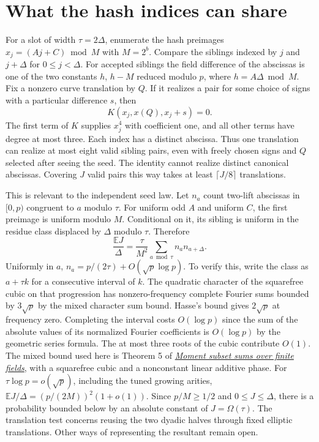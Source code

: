 \documentclass[11pt]{article}
\newcommand{\E}{\mathbb E}
\begin{document}
\section{What the hash indices can share}
For a slot of width $\tau=2\Delta$, enumerate the hash preimages
$x_j=(A j+C)\bmod M$ with $M=2^b$. Compare the siblings indexed
by $j$ and $j+\Delta$ for $0\le j<\Delta$. For accepted siblings
the field difference of the abscissas is one of the two constants
$h$, $h-M$ reduced modulo $p$, where $h=A\Delta\bmod M$.
Fix a nonzero curve translation by $Q$. If it realizes a pair for
some choice of signs with a particular difference $s$, then
\[
            K(x_j,x(Q),x_j+s)=0 .
\]
The first term of $K$ supplies $x_j^4$ with coefficient one, and
all other terms have degree at most three.
Each index has a distinct abscissa. Thus one translation can
realize at most eight valid sibling pairs, even with freely chosen
signs and $Q$ selected after seeing the seed. The identity cannot
realize distinct canonical abscissas. Covering $J$ valid pairs this
way takes at least $\lceil J/8\rceil$ translations.

This is relevant to the independent seed law. Let $n_a$ count
two-lift abscissas in $[0,p)$ congruent to $a$ modulo $\tau$. For
uniform odd $A$ and uniform $C$, the first preimage is uniform
modulo $M$. Conditional on it, its sibling is uniform in the
residue class displaced by $\Delta$ modulo $\tau$. Therefore
\[
  \frac{\E J}{\Delta}=\frac{\tau}{M^2}
       \sum_{a\bmod\tau} n_a n_{a+\Delta}.
\]
Uniformly in $a$, $n_a=p/(2\tau)+O(\sqrt p\log p)$. To verify
this, write the class as $a+\tau k$ for a consecutive interval of
$k$. The quadratic character of the squarefree cubic on that
progression has nonzero-frequency complete Fourier sums bounded by
$3\sqrt p$ by the mixed character sum bound. Hasse's bound gives
$2\sqrt p$ at frequency zero. Completing the interval costs
$O(\log p)$ since the sum of the absolute values of its normalized
Fourier coefficients is $O(\log p)$ by the geometric series
formula. The at most three roots of the cubic contribute $O(1)$.
The mixed bound used here is Theorem 5 of
\href{https://pmc.ncbi.nlm.nih.gov/articles/PMC10941333/}
{\emph{Moment subset sums over finite fields}}, with a squarefree
cubic and a nonconstant linear additive phase.
For $\tau\log p=o(\sqrt p)$, including the tuned growing arities,
$\E J/\Delta=(p/(2M))^2(1+o(1))$. Since $p/M\ge1/2$ and
$0\le J\le\Delta$, there is a probability bounded below by an
absolute constant of $J=\Omega(\tau)$. The translation test
concerns reusing the two dyadic halves through fixed elliptic
translations. Other ways of representing the resultant remain open.
\end{document}
